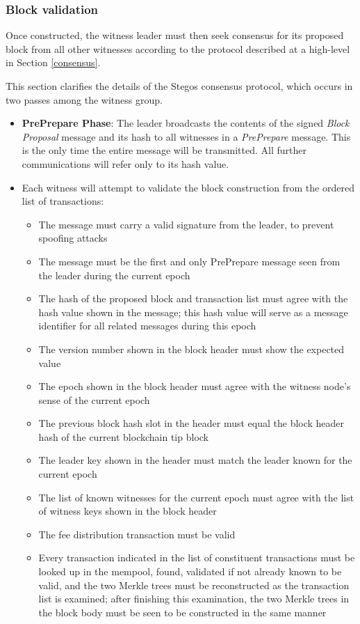 \documentclass[a4paper, 10pt, conference]{ieeeconf}
\begin{document}
\subsubsection{Block validation} Once constructed, the witness leader must then seek consensus for its proposed block from all other witnesses according to the protocol described at a high-level in Section \ref{consensus}. 

This section clarifies the details of the Stegos consensus protocol, which occurs in two passes among the witness group.

\begin{itemize}
	\item {\textbf{PrePrepare Phase}: The leader broadcasts the contents of the signed \textit{Block Proposal} message and its hash to all witnesses in a \textit{PrePrepare} message. This is the only time the entire message will be transmitted. All further communications will refer only to its hash value.}
	\item {Each witness will attempt to validate the block construction from the ordered list of transactions:
		\begin{itemize}
			\item {The message must carry a valid signature from the leader, to prevent spoofing attacks}
			\item {The message must be the first and only PrePrepare message seen from the leader during the current epoch}
			\item {The hash of the proposed block and transaction list must agree with the hash value shown in the message; this hash value will serve as a message identifier for all related messages during this epoch}
			\item {The version number shown in the block header must show the expected value}
			\item {The epoch shown in the block header must agree with the witness node's sense of the current epoch}
			\item {The previous block hash slot in the header must equal the block header hash of the current blockchain tip block}
			\item {The leader key shown in the header must match the leader known for the current epoch}
			\item {The list of known witnesses for the current epoch must agree with the list of witness keys shown in the block header}
			\item {The fee distribution transaction must be valid}
			\item {Every transaction indicated in the list of constituent transactions must be looked up in the mempool, found, validated if not already known to be valid, and the two Merkle trees must be reconstructed as the transaction list is examined; after finishing this examination, the two Merkle trees in the block body must be seen to be constructed in the same manner}

\end{itemize}}
\end{itemize}
\end{document}
